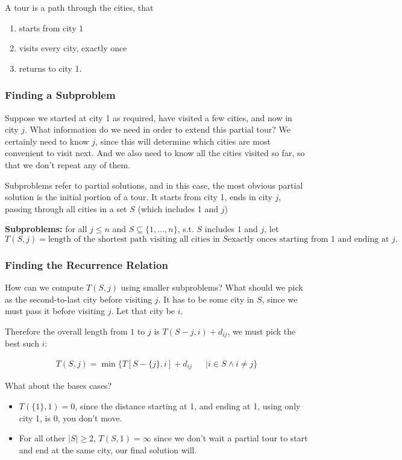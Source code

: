 \documentclass[12pt]{article}
\begin{document}
\begin{definition}[Tour]
    A tour is a path through the cities, that
    \begin{enumerate}
        \item starts from city 1
        \item visits every city, exactly once
        \item returns to city 1.
    \end{enumerate}
\end{definition}

\subsubsection{Finding a Subproblem}
Suppose we started at city 1 as required, have visited a few cities, and now in city $j$. What information do we need in order to extend this partial tour? We certainly need to know $j$, since this will determine which cities are most convenient to visit next. And we also need to know all the cities visited so far, so that we don't repeat any of them.

Subproblems refer to partial solutions, and in this case, the most obvious partial solution is the initial portion of a tour. It starts from city 1, ends in city $j$, passing through all cities in a set $S$ (which includes 1 and $j$)

\textbf{Subproblems: } for all $j \le n$ and $S \subseteq \{1, \dots, n\}$, s.t.  $S$ includes $1$ and $j$, let
$$
    T(S, j) = \text{length of the shortest path visiting all cities in } S \text {exactly onces starting from 1 and ending at }j.
$$

\subsubsection{Finding the Recurrence Relation}
How can we compute $T(S, j)$ using smaller subproblems? What should we pick as the second-to-last city before visiting $j$. It has to be some city in $S$, since we must pass it before visiting $j$. Let that city be $i$.

Therefore the overall length from $1$ to $j$ is $T(S - {j}, i) + d_{ij}$, we must pick the best such $i$:

\begin{align*}
    T(S, j) = \min\{T[S - \{j\}, i] + d_{ij} &  & \mid i \in S \land i \neq j\}
\end{align*}

What about the bases cases?
\begin{itemize}
    \item $T(\{1\}, 1) = 0$, since the distance starting at 1, and ending at 1, using only city 1, is 0, you don't move.
    \item For all other $|S| \ge 2$, $T(S, 1) = \infty$ since we don't wait a partial tour to start and end at the same city, our final solution will.
\end{itemize}
\end{document}
